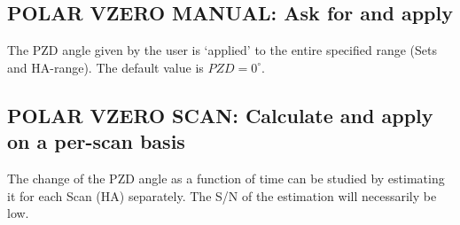 \subsection{POLAR VZERO MANUAL: Ask for and apply}
\label{.vzero.manual}

The PZD angle given by the user is `applied' to the entire specified range
(Sets and HA-range). The default value is $PZD =0^\circ$.

\spbegin %
\spend %
%
\spbegin %
\suser{\scr}
\spend %
%
\spbegin %
\suser{\scr}
\spend %
%
\spbegin %
\suser{\scr}
\spend %
%
\spbegin %
\sdefault{= *:}
\suser{\scr}
\spend %
%
\spbegin %
\spend %

\subsection{POLAR VZERO SCAN: Calculate and apply on a per-scan basis}
\label{.vzero.scan}

The change of the PZD angle as a function of time can be studied by estimating
it for each Scan (HA) separately. The S/N of the estimation will necessarily be
low.

